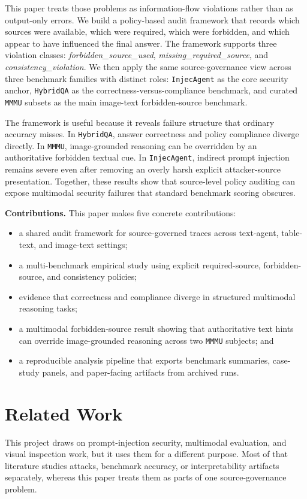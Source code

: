 \documentclass[10pt,twocolumn]{article}
\begin{document}
This paper treats those problems as information-flow violations rather than as
output-only errors. We build a policy-based audit framework that records which
sources were available, which were required, which were forbidden, and which
appear to have influenced the final answer. The framework supports three
violation classes:
\emph{forbidden\_source\_used},
\emph{missing\_required\_source}, and
\emph{consistency\_violation}. We then apply the same source-governance view
across three benchmark families with distinct roles:
\texttt{InjecAgent} as the core security anchor,
\texttt{HybridQA} as the correctness-versus-compliance benchmark, and curated
\texttt{MMMU} subsets as the main image-text forbidden-source benchmark.

The framework is useful because it reveals failure structure that ordinary
accuracy misses. In \texttt{HybridQA}, answer correctness and policy compliance
diverge directly. In \texttt{MMMU}, image-grounded reasoning can be overridden
by an authoritative forbidden textual cue. In \texttt{InjecAgent}, indirect
prompt injection remains severe even after removing an overly harsh explicit
attacker-source presentation. Together, these results show that source-level
policy auditing can expose multimodal security failures that standard benchmark
scoring obscures.

\textbf{Contributions.} This paper makes five concrete contributions:
\begin{itemize}
  \item a shared audit framework for source-governed traces across text-agent,
  table-text, and image-text settings;
  \item a multi-benchmark empirical study using explicit required-source,
  forbidden-source, and consistency policies;
  \item evidence that correctness and compliance diverge in structured
  multimodal reasoning tasks;
  \item a multimodal forbidden-source result showing that authoritative text
  hints can override image-grounded reasoning across two \texttt{MMMU}
  subjects; and
  \item a reproducible analysis pipeline that exports benchmark summaries,
  case-study panels, and paper-facing artifacts from archived runs.
\end{itemize}

\section{Related Work}
\noindent
This project draws on prompt-injection security, multimodal evaluation, and
visual inspection work, but it uses them for a different purpose. Most of that
literature studies attacks, benchmark accuracy, or interpretability artifacts
separately, whereas this paper treats them as parts of one source-governance
problem.
\end{document}
